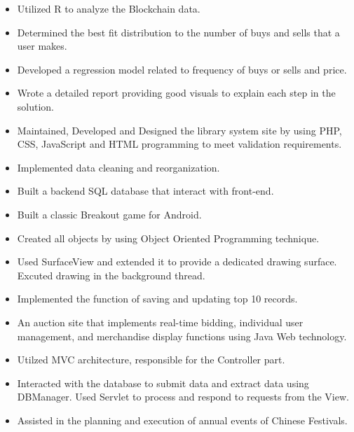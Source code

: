 \begin{itemize}
\item Utilized R to analyze the Blockchain data.
\item Determined the best fit distribution to the number of buys
and sells that a user makes.
\item Developed a regression model related to frequency of buys or sells and price.
\item Wrote a detailed report providing good visuals to explain each step in the solution.
\end{itemize}
\smallskip
{}
\begin{itemize}
\item Maintained, Developed and Designed the library system site by using PHP, CSS, JavaScript and HTML programming to meet validation requirements.
\item Implemented data cleaning and reorganization.
\item Built a backend SQL database that interact with front-end.
\end{itemize}
\smallskip
{}
\begin{itemize}
\item Built a classic Breakout game for Android.
\item Created all objects by using Object Oriented Programming technique.
\item Used SurfaceView and extended it to provide a dedicated drawing surface. Excuted drawing in the background thread.
\item Implemented the function of saving and updating top 10 records.
\end{itemize}
\smallskip
{}
\begin{itemize}
\item An auction site that implements real-time bidding, individual user management, and merchandise display functions using Java Web technology.
\item Utilzed MVC architecture, responsible for the Controller part.
\item Interacted with the database to submit data and extract data using DBManager. Used Servlet to process and respond to requests from the View.
\end{itemize}
\smallskip


\begin{itemize}
  \item Assisted in the planning and execution of annual events of Chinese Festivals.
\end{itemize}
